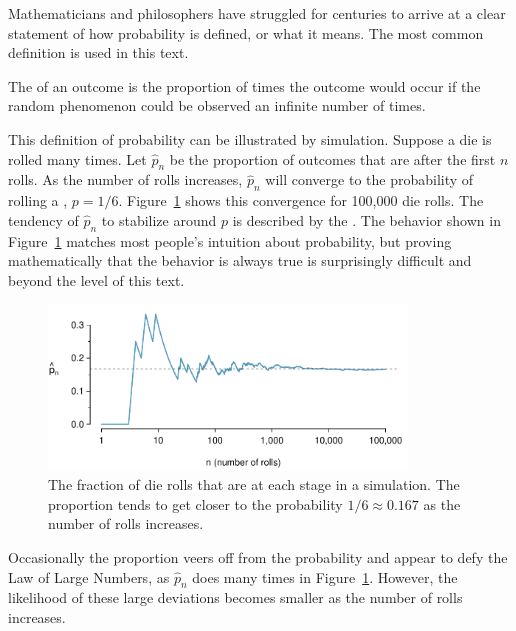 Mathematicians and philosophers have struggled for centuries to arrive at a clear statement of how probability is defined, or what it means. The most common definition is used in this text.

\begin{termBox}{
The  of an outcome is the proportion of times the outcome would occur if the random phenomenon could be observed an infinite number of times.}
\end{termBox}


This definition of probability can be illustrated by simulation. Suppose a die is rolled many times. Let $\hat{p}_n$ be the proportion of outcomes that are  after the first $n$ rolls. As the number of rolls increases, $\hat{p}_n$ will converge to the probability of rolling a , $p = 1/6$. Figure~\ref{fig:dieProp} shows this convergence for 100,000 die rolls. The tendency of $\hat{p}_n$ to stabilize around $p$ is described by the . The behavior shown in Figure~\ref{fig:dieProp} matches most people's intuition about probability, but proving mathematically that the behavior is always true is surprisingly difficult and beyond the level of this text.

\begin{figure}[h]
	\centering
	\includegraphics[width=0.85\textwidth]{ch_probability_oi_biostat/figures/dieProp/dieProp}
	\caption{The fraction of die rolls that are  at each stage in a simulation. The proportion tends to get closer to the probability $1/6 \approx 0.167$ as the number of rolls increases.}
	\label{fig:dieProp}
\end{figure}

Occasionally the proportion veers off from the probability and appear to defy the Law of Large Numbers, as $\hat{p}_n$ does many times in Figure~\ref{fig:dieProp}. However, the likelihood of these large deviations becomes smaller as the number of rolls increases.

